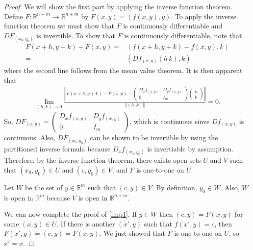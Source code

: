 \documentclass[12pt,reqno]{amsart}
\theoremstyle{definition}
\def\R{\mathbb{R}}
\newcommand{\norm}[1]{\left\Vert {#1} \right\Vert}
\renewcommand{\to}{{\rightarrow}}
\begin{document}
\begin{proof}
  We will show the first part by applying the inverse function
  theorem. Define $F:\R^{n+m} \to \R^{n+m}$ by $F(x,y) =
  (f(x,y),y)$.
  To apply the inverse function theorem we must show that $F$ is
  continuously differentiable and $DF_{(x_0,y_0)}$ is invertible. To
  show that $F$ is continuously differentiable, note that
  \begin{align*}
    F(x+h,y+k)  - F(x,y) = & (f(x+h,y+k) - f(x,y), k) \\
    = & (Df_{(\bar{x},\bar{y})}(h\, k) , k) 
  \end{align*}
  where the second line follows from the mean value theorem. It is
  then apparent that
  \begin{align*}
    \lim_{(h,k) \to 0} \frac{ \norm{ F(x+h,y+k)  - F(x,y)
        - \begin{pmatrix} D_xf_{(x,y)} & D_yf_{(x,y)} \\
          0 & I_m \end{pmatrix} \begin{pmatrix} h \\ k \end{pmatrix}} }
    {\norm{(h,k)}} = 0.
  \end{align*}
  So, $DF_{(x,y)} = \begin{pmatrix} D_xf_{(x,y)} &  D_yf_{(x,y)}  \\
    0 & I_m \end{pmatrix}$, which is continuous
  sinve $Df_{(x,y)}$ is continuous. Also, $DF_{(x_0,y_0)}$ can be
  shown to be invertible by using the partitioned inverse formula
  because $D_xf_{(x_0,y_0)}$ is invertiable by assumption. Therefore,
  by the inverse function theorem, there exists open sets $U$ and $V$
  such that $(x_0, y_0) \in U$ and $(c,y_0) \in V$, and $F$ is
  one-to-one on $U$. 
  
  Let $W$ be the set of $y \in \R^m$ such that $(c,y) \in V$. By
  definition, $y_0 \in W$. Also, $W$ is open in $\R^m$ because $V$ is
  open in $\R^{n+m}$. 
  
  We can now complete the proof of \ref{imp1}. If $y \in W$ then
  $(c,y) = F(x,y)$ for some $(x,y) \in U$. If there is another
  $(x',y)$ such that $f(x',y) = c$, then $F(x',y) = (c,y) =
  F(x,y)$. We just showed that $F$ is one-to-one on $U$, so $x'=x$.  
 

\end{proof}
\end{document}
